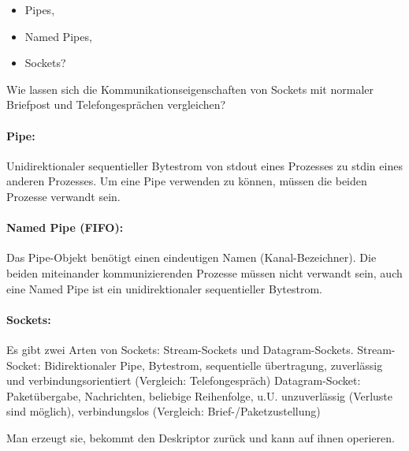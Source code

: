 \begin{multilinequestion}
\begin{itemize}
\item Pipes,
\item Named Pipes,
\item Sockets?
\end{itemize}

Wie lassen sich die Kommunikationseigenschaften von Sockets mit normaler Briefpost und Telefongesprächen vergleichen?
\end{multilinequestion}

\question{}
\begin{answer}

\paragraph*{Pipe:}
Unidirektionaler sequentieller Bytestrom von stdout eines Prozesses zu stdin eines anderen Prozesses. Um eine Pipe verwenden zu können, müssen die beiden Prozesse verwandt sein.

\paragraph*{Named Pipe (FIFO):}\label{netzwerke:named-pipe}
Das Pipe-Objekt benötigt einen eindeutigen Namen (Kanal-Bezeichner). Die
beiden miteinander kommunizierenden Prozesse müssen nicht verwandt sein, auch eine Named Pipe ist ein unidirektionaler sequentieller Bytestrom.

\paragraph*{Sockets:}\label{netzwerke:sockets}
Es gibt zwei Arten von Sockets: Stream-Sockets und Datagram-Sockets.
Stream-Socket: Bidirektionaler Pipe, Bytestrom, sequentielle übertragung, zuverlässig und verbindungsorientiert (Vergleich: Telefongespräch)
Datagram-Socket: Paketübergabe, Nachrichten, beliebige Reihenfolge, u.U. unzuverlässig (Verluste
sind möglich), verbindungslos (Vergleich: Brief-/Paketzustellung)
\end{answer}

\begin{answer}
Man erzeugt sie, bekommt den Deskriptor zurück und kann auf ihnen operieren.
\end{answer}

